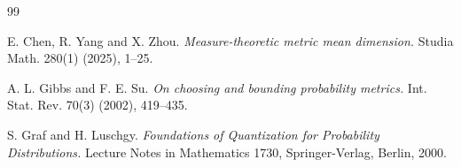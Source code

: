 \documentclass[11pt,a4paper,reqno]{amsart}
\theoremstyle{plain}
\theoremstyle{definition}
\begin{document}
\begin{thebibliography}{99}






E. Chen, R. Yang and X. Zhou.
\newblock \emph{Measure-theoretic metric mean dimension.}
\newblock Studia Math. 280(1) (2025), 1--25.


%



A. L. Gibbs and F. E. Su.
\newblock \emph{On choosing and bounding probability metrics.}
\newblock Int. Stat. Rev. 70(3) (2002), 419--435.


S. Graf and H. Luschgy.
\newblock \emph{Foundations of Quantization for Probability Distributions.}
\newblock Lecture Notes in Mathematics 1730, Springer-Verlag, Berlin, 2000.


\end{thebibliography}
\end{document}
